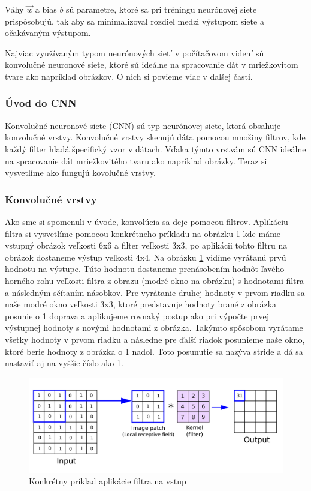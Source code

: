 Váhy $\vec{w}$ a bias $b$ sú parametre, ktoré sa pri tréningu neurónovej siete prispôsobujú, tak aby sa minimalizoval rozdiel medzi výstupom siete a očakávaným výstupom.

Najviac využívaným typom neurónových sietí v počítačovom videní sú konvolučné neuronové siete, ktoré sú ideálne na spracovanie dát v mriežkovitom tvare ako napríklad obrázkov. O nich si povieme viac v ďalšej časti.

\subsubsection{Úvod do CNN}
Konvolučné neuronové siete (CNN) \cite{CNN} sú typ neurónovej siete, ktorá obsahuje konvolučné vrstvy. Konvolučné vrstvy skenujú dáta pomocou množiny filtrov, kde každý filter hľadá špecifický vzor v dátach. Vďaka týmto vrstvám sú CNN ideálne na spracovanie dát mriežkovitého tvaru ako napríklad obrázky. Teraz si vysvetlíme ako fungujú kovolučné vrstvy.

\subsubsection{Konvolučné vrstvy}

Ako sme si spomenuli v úvode, konvolúcia sa deje pomocou filtrov. Aplikáciu filtra si vysvetlíme pomocou konkrétneho príkladu na obrázku \ref{fig:image301} kde máme vstupný obrázok veľkosti 6x6 a filter veľkosti 3x3, po aplikácii tohto filtru na obrázok dostaneme výstup veľkosti 4x4. Na obrázku \ref{fig:image301} vidíme vyrátanú prvú hodnotu na výstupe. Túto hodnotu dostaneme prenásobením hodnôt ľavého horného rohu veľkosti filtra z obrazu (modré okno na obrázku) s hodnotami filtra a následným sčítaním násobkov. Pre vyrátanie druhej hodnoty v prvom riadku sa naše modré okno veľkosti 3x3, ktoré predstavuje hodnoty brané z obrázka posunie o 1 doprava a aplikujeme rovnaký postup ako pri výpočte prvej výstupnej hodnoty s novými hodnotami z obrázka. Takýmto spôsobom vyrátame všetky hodnoty v prvom riadku a následne pre ďalší riadok posunieme naše okno, ktoré berie hodnoty z obrázka o 1 nadol. Toto posunutie sa nazýva stride a dá sa nastaviť aj na vyššie číslo ako 1.

\begin{figure}[H]
\includegraphics[width=\textwidth]{images/filter.png}
\centering
\caption{Konkrétny príklad aplikácie filtra na vstup}
\label{fig:image301}
\end{figure}

